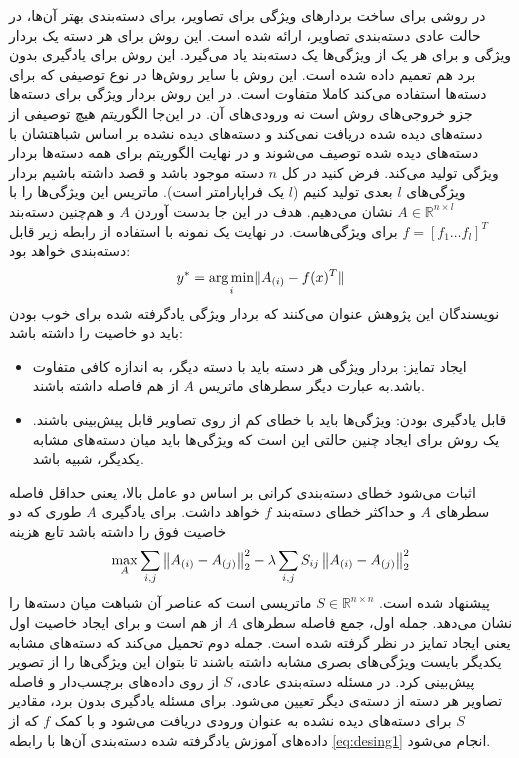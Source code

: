  
 در \cite{Yu2013} روشی برای ساخت بردارهای ویژگی برای تصاویر، برای دسته‌بندی بهتر آن‌ها، در حالت عادی دسته‌بندی تصاویر، ارائه شده است. این روش برای هر دسته یک بردار ویژگی و برای هر یک از ويژگی‌ها یک دسته‌بند یاد می‌گیرد. 
  این روش برای یادگیری بدون برد هم تعمیم داده شده است. این روش با سایر روش‌ها در نوع توصیفی که برای دسته‌ها استفاده می‌کند کاملا متفاوت است. در این روش بردار ویژگی برای دسته‌ها جزو خروجی‌های روش است نه ورودی‌های آن. در این‌جا الگوریتم هیچ توصیفی از دسته‌های دیده شده دریافت نمی‌کند و دسته‌های دیده نشده بر اساس شباهتشان با دسته‌های دیده شده توصیف می‌شوند و در نهایت الگوریتم برای همه دسته‌ها بردار ویژگی تولید می‌کند. فرض کنید در کل $n$ دسته موجود باشد و قصد داشته باشیم بردار ویژگی‌های $l$ بعدی تولید کنیم ($l$ یک فراپارامتر است). ماتریس این ويژگی‌ها را با 
  $ A \in \mathbb{R}^{n \times l}$
  نشان می‌دهیم. هدف در این جا بدست آوردن $A$ و هم‌چنین دسته‌بند
$f = [f_1 \ldots f_l]^T$
   برای ویژگی‌هاست. در نهایت یک نمونه با استفاده از رابطه زیر قابل دسته‌بندی خواهد بود:
 \begin{equation}
 \label{eq:desing1}
 y^* = \operatorname*{arg\,min}_i \lVert A_{(i)} - f(x)^T \rVert
 \end{equation}
 نویسندگان این پژوهش عنوان می‌کنند که بردار ویژگی یادگرفته شده برای خوب بودن باید دو خاصیت را داشته باشد:
 \begin{itemize}
 \item 
 ایجاد تمایز: بردار ویژگی هر دسته باید با دسته دیگر، به اندازه کافی متفاوت باشد.به عبارت دیگر سطرهای ماتریس $A$ از هم فاصله داشته باشند.
 \item
 قابل یادگیری بودن: ویژگی‌ها باید با خطای کم از روی تصاویر قابل پیش‌بینی باشند. یک روش برای ایجاد چنین حالتی این است که ویژگی‌ها باید میان دسته‌های مشابه یکدیگر، شبیه باشد.
 \end{itemize}
اثبات می‌شود خطای دسته‌بندی کرانی بر اساس دو عامل بالا، یعنی حداقل فاصله سطرهای $A$ و حداکثر خطای دسته‌بند $f$ خواهد داشت. 
برای یادگیری $A$ طوری که دو خاصیت فوق را داشته باشد تابع هزینه 
\begin{equation}
\label{eq:design2}
\max_A \sum_{i,j} \left \lVert A_{(i)} - A_{(j)} \right \rVert_2^2 - \lambda \sum_{i,j} S_{ij} \left \lVert A_{(i)} - A_{(j)} \right \rVert_2^2
\end{equation}
پیشنهاد شده است.
$ S \in \mathbb{R}^{n \times n}$
 ماتریسی است که عناصر آن شباهت میان دسته‌ها را نشان می‌دهد. جمله اول، جمع فاصله سطرهای $A$ از هم است و  برای ایجاد خاصیت اول یعنی ایجاد تمایز در نظر گرفته شده است. جمله دوم تحمیل می‌کند که دسته‌های مشابه یکدیگر بایست ویژگی‌های بصری مشابه داشته باشند تا بتوان این ویژگی‌ها را از تصویر پیش‌بینی کرد. 
 در مسئله دسته‌بندی عادی، $S$ از روی داده‌های برچسب‌دار و  فاصله تصاویر هر دسته از دسته‌ی دیگر تعیین می‌شود. برای مسئله یادگیری بدون برد، مقادیر $S$ برای دسته‌های دیده نشده به عنوان ورودی دریافت می‌شود و با کمک $f$ که از داده‌های آموزش یادگرفته شده دسته‌بندی آن‌ها با رابطه 
 \eqref{eq:desing1}
  انجام می‌شود.


